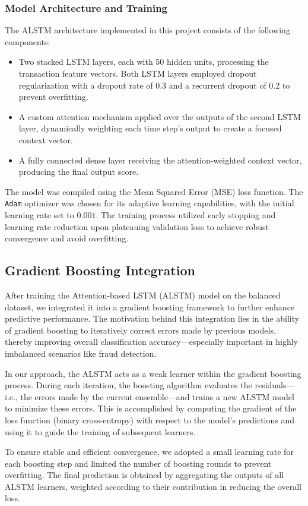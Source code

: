 \subsubsection{Model Architecture and Training}
The ALSTM architecture implemented in this project consists of the following components:
\begin{itemize}
    \item Two stacked LSTM layers, each with 50 hidden units, processing the transaction feature vectors. Both LSTM layers employed dropout regularization with a dropout rate of 0.3 and a recurrent dropout of 0.2 to prevent overfitting.
    \item A custom attention mechanism applied over the outputs of the second LSTM layer, dynamically weighting each time step's output to create a focused context vector.
    \item A fully connected dense layer receiving the attention-weighted context vector, producing the final output score.
\end{itemize}

The model was compiled using the Mean Squared Error (MSE) loss function. The \texttt{Adam} optimizer was chosen for its adaptive learning capabilities, with the initial learning rate set to $0.001$. The training process utilized early stopping and learning rate reduction upon plateauing validation loss to achieve robust convergence and avoid overfitting.

\subsection{Gradient Boosting Integration}
After training the Attention-based LSTM (ALSTM) model on the balanced dataset, we integrated it into a gradient boosting framework to further enhance predictive performance. The motivation behind this integration lies in the ability of gradient boosting to iteratively correct errors made by previous models, thereby improving overall classification accuracy—especially important in highly imbalanced scenarios like fraud detection.

In our approach, the ALSTM acts as a weak learner within the gradient boosting process. During each iteration, the boosting algorithm evaluates the residuals—i.e., the errors made by the current ensemble—and trains a new ALSTM model to minimize these errors. This is accomplished by computing the gradient of the loss function (binary cross-entropy) with respect to the model's predictions and using it to guide the training of subsequent learners.

To ensure stable and efficient convergence, we adopted a small learning rate for each boosting step and limited the number of boosting rounds to prevent overfitting. The final prediction is obtained by aggregating the outputs of all ALSTM learners, weighted according to their contribution in reducing the overall loss.